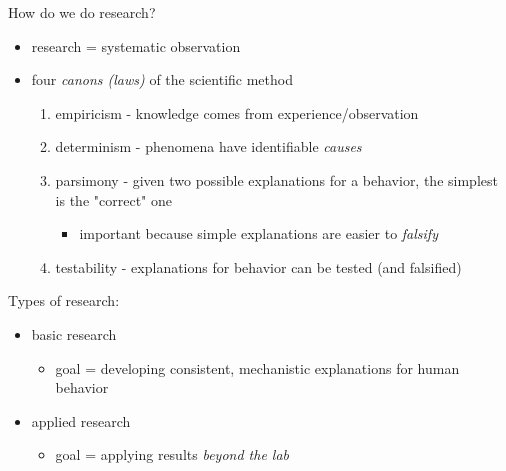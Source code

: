 \documentclass[11pt]{article}
\begin{document}
How do we do research?
\begin{itemize}
\item research = systematic observation
\item four \emph{canons (laws)} of the scientific method
\begin{enumerate}
\item empiricism - knowledge comes from experience/observation
\item determinism - phenomena have identifiable \emph{causes}
\item parsimony - given two possible explanations for a behavior, the simplest is the "correct" one
\begin{itemize}
\item important because simple explanations are easier to \emph{falsify}
\end{itemize}
\item testability - explanations for behavior can be tested (and falsified)
\end{enumerate}
\end{itemize}

Types of research:
\begin{itemize}
\item basic research
\begin{itemize}
\item goal = developing consistent, mechanistic explanations for human behavior
\end{itemize}
\item applied research
\begin{itemize}
\item goal = applying results \emph{beyond the lab}
\end{itemize}
\end{itemize}
\end{document}
